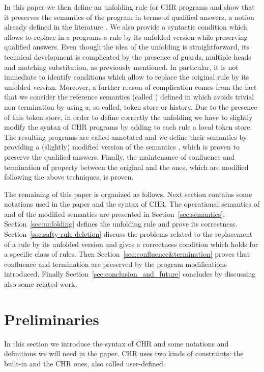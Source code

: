 \documentclass[final]{acmtrans2e}
\begin{document}
In this paper we then define an unfolding rule for CHR programs
and show that it preserves the semantics of the program in terms
of qualified answers, a notion already defined in the literature
\cite{Fru98}.
We also provide a syntactic condition which allows to replace in a
programs a rule by its unfolded version  while preserving
qualified answers. Even though the idea of the unfolding is
straightforward, its technical development is complicated by the
presence of guards, multiple heads and matching substitution,
as previously mentioned. In
particular, it is not immediate to identify conditions which
allow to replace the original rule by its unfolded version.
Moreover, a further reason of complication comes from the fact
that we consider the reference semantics (called )
defined in \cite{DSGH04} which avoids trivial non termination by
using a, so called, token store or history. Due
to the presence of this token store,  in order to define correctly
the unfolding we have to slightly modify the syntax of CHR programs
by adding to each rule  a local token store. The resulting programs
are called annotated and we define their semantics by providing a
(slightly) modified version of the semantics , which is
proven to preserve the qualified answers. Finally, the maintenance
of confluence and termination of property between the original and
the ones, which are modified following the above techniques, is proven.

The remaining of this paper is organized as follows. Next section
contains some notations used in the paper and the syntax of CHR.
The operational semantics of  \cite{DSGH04} and of the
modified semantics   are presented  in
Section~\ref{sec:semantics}. Section~\ref{sec:unfolding} defines
the unfolding rule and prove its correctness.
Section~\ref{sec:safty-rule-deletion}  discuss the problems
related to the replacement of a rule by its unfolded version and
gives a correctness condition which holds for a specific class of
rules. Then Section~\ref{sec:confluence&termination} proves that
confluence and termination are preserved by the program modifications
introduced. Finally Section~\ref{sec:conclusion_and_future} concludes
by discussing also some related work.




\section{Preliminaries}\label{sec:notation}

In this section we introduce the syntax of CHR and some notations
and definitions we will need in the paper. CHR uses two kinds
of constraints: the built-in and the CHR ones, also called
user-defined.
\end{document}

